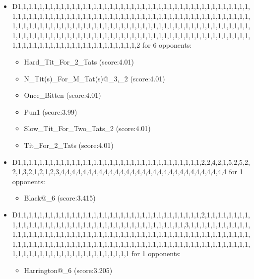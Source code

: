 \begin{appendices}
\begin{itemize}
        \item D1,1,1,1,1,1,1,1,1,1,1,1,1,1,1,1,1,1,1,1,1,1,1,1,1,1,1,1,1,1,1,1,1,1,1,1,1,1,1,1,1,1,1,1,1,1,1,1,1,1,1,1,1,1,1,1,1,1,1,1,1,1,1,1,1,1,1,1,1,1,1,1,1,1,1,1,1,1,1,1,1,1,1,1,1,1,1,1,1,1,1,1,1,1,1,1,1,1,1,1,1,1,1,1,1,1,1,1,1,1,1,1,1,1,1,1,1,1,1,1,1,1,1,1,1,1,1,1,1,1,1,1,1,1,1,1,1,1,1,1,1,1,1,1,1,1,1,1,1,1,1,1,1,1,1,1,1,1,1,1,1,1,1,1,1,1,1,1,1,1,1,1,1,1,1,1,1,1,1,1,1,1,1,1,1,1,1,1,1,1,1,1,1,1,1,1,1,1,2 for 6 opponents:
        \begin{multicols}{3}
            \begin{itemize}
                \item Hard\_Tit\_For\_2\_Tats (score:4.01)
                \item N\_Tit(s)\_For\_M\_Tat(s)@\_3,\_2 (score:4.01)
                \item Once\_Bitten (score:4.01)
                \item Pun1 (score:3.99)
                \item Slow\_Tit\_For\_Two\_Tats\_2 (score:4.01)
                \item Tit\_For\_2\_Tats (score:4.01)
            \end{itemize}
        \end{multicols}

        \item D1,1,1,1,1,1,1,1,1,1,1,1,1,1,1,1,1,1,1,1,1,1,1,1,1,1,1,1,1,1,1,1,1,1,2,2,4,2,1,5,2,5,2,2,1,3,2,1,2,1,2,3,4,4,4,4,4,4,4,4,4,4,4,4,4,4,4,4,4,4,4,4,4,4,4,4,4,4,4,4,4,4,4 for 1 opponents:
        \begin{multicols}{3}
            \begin{itemize}
                \item Black@\_6 (score:3.415)
            \end{itemize}
        \end{multicols}

        \item D1,1,1,1,1,1,1,1,1,1,1,1,1,1,1,1,1,1,1,1,1,1,1,1,1,1,1,1,1,1,1,1,1,1,2,1,1,1,1,1,1,1,1,1,1,1,1,1,1,1,1,1,1,1,1,1,1,1,1,1,1,1,1,1,1,1,1,1,1,1,1,1,1,1,1,3,1,1,1,1,1,1,1,1,1,1,1,1,1,1,1,1,1,1,1,1,1,1,1,1,1,1,1,1,1,1,1,1,1,1,1,1,1,1,1,1,1,1,1,1,1,1,1,1,1,1,1,1,1,1,1,1,1,1,1,1,1,1,1,1,1,1,1,1,1,1,1,1,1,1,1,1,1,1,1,1,1,1,1,1,1,1,1,1,1,1,1,1,1,1,1,1,1,1,1,1,1,1,1,1,1,1,1,1,1,1,1,1,1,1,1,1,1,1,1,1,1 for 1 opponents:
        \begin{multicols}{3}
            \begin{itemize}
                \item Harrington@\_6 (score:3.205)
            \end{itemize}
        \end{multicols}


\end{itemize}
\end{appendices}
